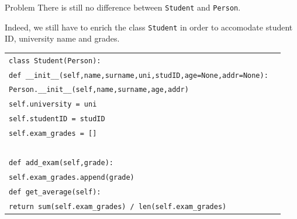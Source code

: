 \documentclass[t,handout,9pt]{beamer}
\begin{document}
\begin{frame}
\vfill
\begin{block}{Problem}
There is still no difference between \texttt{Student} and \texttt{Person}.
\end{block}
Indeed, we still have to enrich the class \texttt{Student} in order to accomodate student ID, university name and grades.
\begin{table}[]
\begin{flushleft}
\begin{tabular}{ll}
\texttt{class Student(Person):} &  \\
\texttt{\quad def \_\_init\_\_(self,name,surname,uni,studID,age=None,addr=None):}& \\
\texttt{\quad\quad Person.\_\_init\_\_(self,name,surname,age,addr)}& \\
\texttt{\quad\quad self.university = uni}& \\
\texttt{\quad\quad self.studentID = studID}& \\
\texttt{\quad\quad self.exam\_grades = []}& \\
\texttt{ } &  \\
\texttt{\quad def add\_exam(self,grade):}& \\
\texttt{\quad\quad self.exam\_grades.append(grade)}& \\
\texttt{\quad def get\_average(self):}& \\
\texttt{\quad\quad return sum(self.exam\_grades) / len(self.exam\_grades)}& \\
\end{tabular}
\end{flushleft}
\end{table}
\vfill
\end{frame}
%
\end{document}
